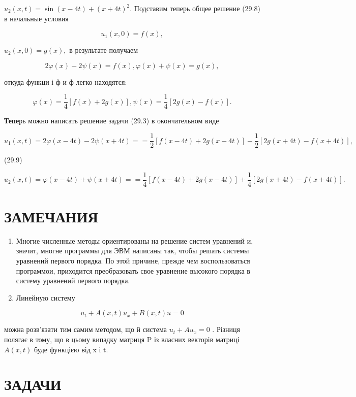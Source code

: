 \documentclass[
  ukrainian,
]{article}
\begin{document}
\(u_2(x, t) = \sin(x-4t) + (x+4t)^2.\) Подставим теперь общее решение
(29.8) в начальные условия

\[
u_1(x, 0) = f(x),
\]

\(u_2(x, 0) = g(x),\) в результате получаем

\[
2\varphi(x) - 2\psi(x) = f(x),
\varphi(x) + \psi(x) = g(x),
\]

откуда функци і ф и ф легко находятся:

\[
\varphi(x) = \frac{1}{4} \left[ f(x) + 2g(x) \right],
\psi(x) = \frac{1}{4} \left[ 2g(x) - f(x) \right].
\]

\textbf{Тепе}рь можно написать решение задачи (29.3) в окончательном
виде

\[
u_{1}(x, t) = 2\varphi(x-4t) - 2\psi(x+4t) =
= \frac{1}{2} \left[ f(x-4t) + 2g(x-4t) \right] - \frac{1}{2} \left[ 2g(x+4t) - f(x+4t) \right],
\]

(29.9)

\[
u_{2}(x, t) = \varphi(x-4t) + \psi(x+4t) =
= \frac{1}{4} \left[ f(x-4t) + 2g(x-4t) \right] + \frac{1}{4} \left[ 2g(x+4t) - f(x+4t) \right].
\]

\section{ЗАМЕЧАНИЯ}\label{ux437ux430ux43cux435ux447ux430ux43dux438ux44f-12}

\begin{enumerate}
\def\labelenumi{\arabic{enumi}.}
\item
  Многие численные методы ориентированы на решение систем уравнений и,
  значит, многне программы для ЭВМ написаны так, чтобы решать системы
  уравнений первого порядка. По этой причине, прежде чем воспользоваться
  программои, приходится преобразовать свое уравнение высокого порядка в
  систему уравнений первого порядка.
\item
  Линейную систему
\end{enumerate}

\[
u_t + A(x, t) u_x + B(x, t) u = 0
\]

можна розв'язати тим самим методом, що й система \(u_t + Au_x = 0\) .
Різниця полягає в тому, що в цьому випадку матриця P із власних векторів
матриці \(A(x, t)\) буде функцією від x і t.

\section{ЗАДАЧИ}\label{ux437ux430ux434ux430ux447ux438-13}
\end{document}
